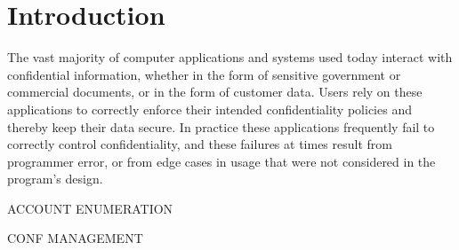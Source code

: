 \chapter{Introduction}

The vast majority of computer applications and systems used today interact with confidential information, whether in the form of sensitive government or commercial documents, or in the form of customer data. Users rely on these applications to correctly enforce their intended confidentiality policies and thereby keep their data secure. In practice these applications frequently fail to correctly control confidentiality, and these failures at times result from programmer error, or from edge cases in usage that were not considered in the program's design.

ACCOUNT ENUMERATION

CONF MANAGEMENT